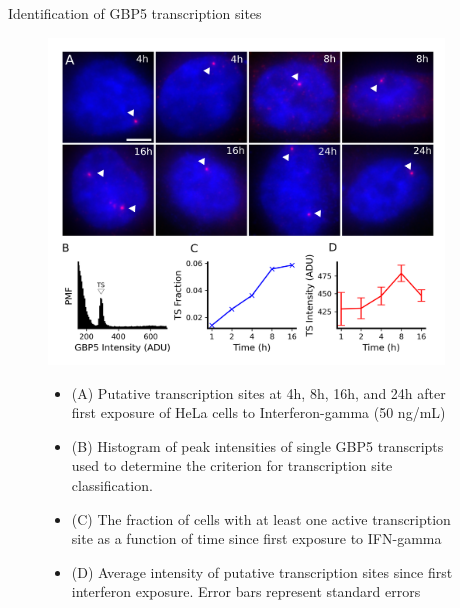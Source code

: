 \documentclass{beamer}					%
\begin{document}
\begin{frame}{Identification of GBP5 transcription sites}
\begin{figure}
\includegraphics[width=10.5cm]{Figure-2.png}
\begin{itemize}
\item {\fontsize{8pt}{16.8pt}\selectfont (A) Putative transcription sites at 4h, 8h, 16h, and 24h after first exposure of HeLa cells to Interferon-gamma (50 ng/mL) }
\item {\fontsize{8pt}{16.8pt}\selectfont (B) Histogram of peak intensities of single GBP5 transcripts used to determine the criterion for transcription site classification. }
\item {\fontsize{8pt}{16.8pt}\selectfont (C)  The fraction of cells with at least one active transcription site as a function of time since first exposure to IFN-gamma }
\item {\fontsize{8pt}{16.8pt}\selectfont (D) Average intensity of putative transcription sites since first interferon exposure. Error bars represent standard errors}
\end{itemize}
\end{figure}
\end{frame}
\end{document}
